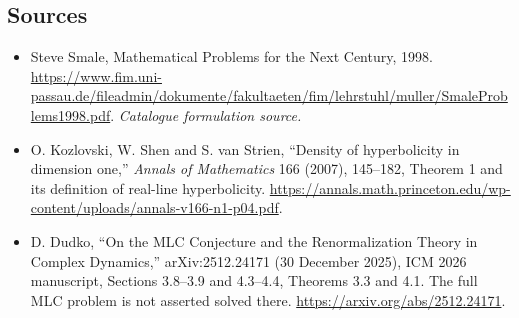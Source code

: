 \documentclass[11pt,a4paper]{article}
\begin{document}
\subsection{Sources}
\begin{itemize}\raggedright
\item[\textnormal{[S1]}]\hypertarget{source:statement:1}{} Steve Smale, Mathematical Problems for the Next Century, 1998.
\url{https://www.fim.uni-passau.de/fileadmin/dokumente/fakultaeten/fim/lehrstuhl/muller/SmaleProblems1998.pdf}.
{\small\textit{Catalogue formulation source.}}
\item[\textnormal{[E1]}]\hypertarget{extra:statement:1}{} O. Kozlovski, W. Shen and S. van Strien, ``Density of hyperbolicity in dimension one,'' \emph{Annals of Mathematics} 166 (2007), 145--182, Theorem 1 and its definition of real-line hyperbolicity.
\url{https://annals.math.princeton.edu/wp-content/uploads/annals-v166-n1-p04.pdf}.
\item[\textnormal{[E2]}]\hypertarget{extra:statement:2}{} D. Dudko, ``On the MLC Conjecture and the Renormalization Theory in Complex Dynamics,'' arXiv:2512.24171 (30 December 2025), ICM 2026 manuscript, Sections 3.8--3.9 and 4.3--4.4, Theorems 3.3 and 4.1. The full MLC problem is not asserted solved there.
\url{https://arxiv.org/abs/2512.24171}.
\end{itemize}
\end{document}
